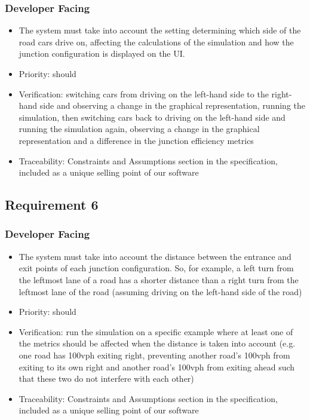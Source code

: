 \documentclass{article}
\begin{document}
\subsubsection{Developer Facing}
\begin{itemize}
  \item The system must take into account the setting determining which side of
  the road cars drive on, affecting the calculations of the simulation and how 
  the junction configuration is displayed on the UI.
  \item Priority: should
  \item Verification: switching cars from driving on the left-hand side to the 
  right-hand side and observing a change in the graphical representation, running 
  the simulation, then switching cars back to driving on the left-hand side and 
  running the simulation again, observing a change in the graphical representation 
  and a difference in the junction efficiency metrics
  \item Traceability: Constraints and Assumptions section in the specification, included 
  as a unique selling point of our software
\end{itemize}

\subsection{Requirement 6}
\subsubsection{Developer Facing}
\begin{itemize}
  \item The system must take into account the distance between the entrance and exit 
  points of each junction configuration. So, for example, a left turn from the 
  leftmost lane of a road has a shorter distance than a right turn from the leftmost 
  lane of the road (assuming driving on the left-hand side of the road)
  \item Priority: should
  \item Verification: run the simulation on a specific example where at least one of 
  the metrics should be affected when the distance is taken into account (e.g. one 
  road has 100vph exiting right, preventing another road’s 100vph from exiting to its
  own right and another road’s 100vph from exiting ahead such that these two do not 
  interfere with each other)
  \item Traceability: Constraints and Assumptions section in the specification, included 
  as a unique selling point of our software
\end{itemize}
\end{document}
